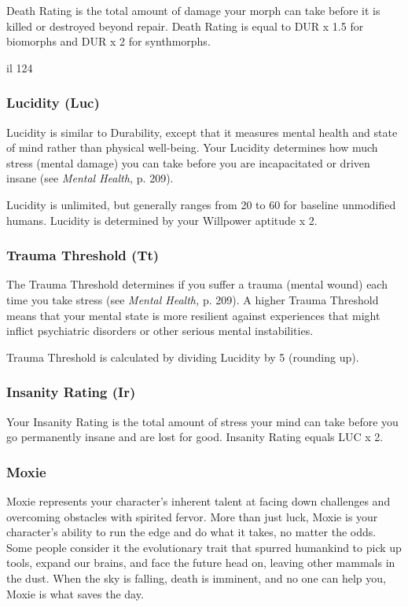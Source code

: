 Death Rating is the total amount of damage your 
morph can take before it is killed or destroyed 
beyond repair. Death Rating is equal to DUR x 1.5 for 
biomorphs and DUR x 2 for synthmorphs.

il
124

\subsubsection{Lucidity (Luc)}

Lucidity is similar to Durability, except that it measures 
mental health and state of mind rather than physical 
well-being. Your Lucidity determines how much stress 
(mental damage) you can take before you are incapacitated
or driven insane (see \textit{Mental Health,} p. 209).

Lucidity is unlimited, but generally ranges from 
20 to 60 for baseline unmodified humans. Lucidity is 
determined by your Willpower aptitude x 2.

\subsubsection{Trauma Threshold (Tt)}

The Trauma Threshold determines if you suffer a 
trauma (mental wound) each time you take stress (see 
\textit{Mental Health,} p. 209). A higher Trauma Threshold 
means that your mental state is more resilient against 
experiences that might inflict psychiatric disorders or 
other serious mental instabilities.

Trauma Threshold is calculated by dividing Lucidity 
by 5 (rounding up).

\subsubsection{Insanity Rating (Ir)}

Your Insanity Rating is the total amount of stress your 
mind can take before you go permanently insane and 
are lost for good. Insanity Rating equals LUC x 2.

\subsubsection{Moxie}

Moxie represents your character's inherent talent at 
facing down challenges and overcoming obstacles 
with spirited fervor. More than just luck, Moxie is 
your character's ability to run the edge and do what 
it takes, no matter the odds. Some people consider it 
the evolutionary trait that spurred humankind to pick 
up tools, expand our brains, and face the future head 
on, leaving other mammals in the dust. When the sky 
is falling, death is imminent, and no one can help you, 
Moxie is what saves the day.

